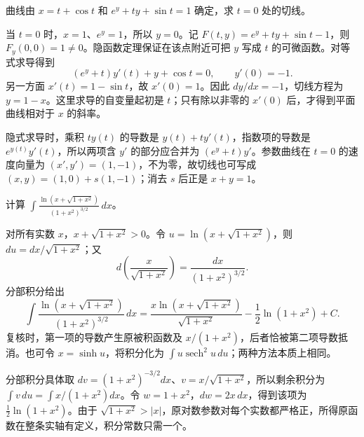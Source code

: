 \documentclass[UTF8,12pt,a4paper,fontset=fandol]{ctexart}
\begin{document}
\begin{example}\label{nm-2018-1b}
曲线由 $x=t+\cos t$ 和 $e^y+ty+\sin t=1$ 确定，求 $t=0$ 处的切线。
\end{example}
\begin{solve}
当 $t=0$ 时，$x=1$、$e^y=1$，所以 $y=0$。记 $F(t,y)=e^y+ty+\sin t-1$，则 $F_y(0,0)=1\ne0$。隐函数定理保证在该点附近可把 $y$ 写成 $t$ 的可微函数。对等式求导得到
\[
 (e^y+t)y'(t)+y+\cos t=0,
 \qquad y'(0)=-1.
\]
另一方面 $x'(t)=1-\sin t$，故 $x'(0)=1$。因此 $dy/dx=-1$，切线方程为 $y=1-x$。这里求导的自变量起初是 $t$；只有除以非零的 $x'(0)$ 后，才得到平面曲线相对于 $x$ 的斜率。

隐式求导时，乘积 $ty(t)$ 的导数是 $y(t)+ty'(t)$，指数项的导数是 $e^{y(t)}y'(t)$，所以两项含 $y'$ 的部分应合并为 $(e^y+t)y'$。参数曲线在 $t=0$ 的速度向量为 $(x',y')=(1,-1)$，不为零，故切线也可写成 $(x,y)=(1,0)+s(1,-1)$；消去 $s$ 后正是 $x+y=1$。

\end{solve}

\begin{example}\label{nm-2018-1c}
计算 $\displaystyle\int\frac{\ln(x+\sqrt{1+x^2})}{(1+x^2)^{3/2}}\,dx$。
\end{example}
\begin{solve}
对所有实数 $x$，$x+\sqrt{1+x^2}>0$。令 $u=\ln(x+\sqrt{1+x^2})$，则 $du=dx/\sqrt{1+x^2}$；又
\[
 d\left(\frac{x}{\sqrt{1+x^2}}\right)=\frac{dx}{(1+x^2)^{3/2}}.
\]
分部积分给出
\[
 \int\frac{\ln(x+\sqrt{1+x^2})}{(1+x^2)^{3/2}}\,dx
 =\frac{x\ln(x+\sqrt{1+x^2})}{\sqrt{1+x^2}}
 -\frac12\ln(1+x^2)+C.
\]
复核时，第一项的导数产生原被积函数及 $x/(1+x^2)$，后者恰被第二项导数抵消。也可令 $x=\sinh u$，将积分化为 $\int u\operatorname{sech}^2u\,du$；两种方法本质上相同。

分部积分具体取 $dv=(1+x^2)^{-3/2}dx$、$v=x/\sqrt{1+x^2}$，所以剩余积分为 $\int v\,du=\int x/(1+x^2)dx$。令 $w=1+x^2$，$dw=2x\,dx$，得到该项为 $\tfrac12\ln(1+x^2)$。由于 $\sqrt{1+x^2}>|x|$，原对数参数对每个实数都严格正，所得原函数在整条实轴有定义，积分常数只需一个。

\end{solve}
\end{document}
